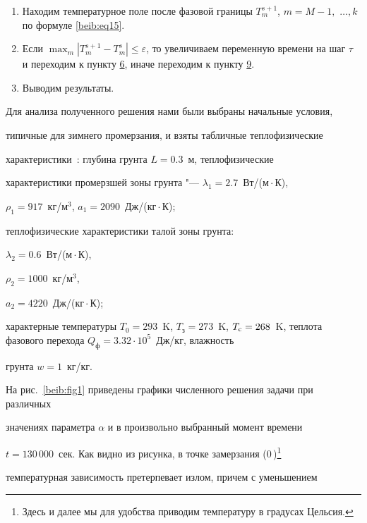\begin{enumerate}
\item Находим температурное поле после фазовой границы $T_m^{s+1}$, $m={M-1},$ $\ldots,k$ по формуле \eqref{beib:eq15}.

\item Если $\max _m | T_m^{s+1} -T_m^s |\le \varepsilon$, то увеличиваем переменную времени на шаг $\tau $ и переходим к пункту \hyperlink{p6}{6}, иначе переходим к пункту \hyperlink{p9}{9}.

\item \hypertarget{p17}{} Выводим результаты.

\end{enumerate}



\smallskip




Для анализа полученного решения нами были выбраны начальные условия, 

типичные для зимнего промерзания, и взяты табличные теплофизические 

характеристики~\cite[стр.~133]{beib:bib17}: глубина грунта $L=0.3$~м, теплофизические 

характеристики промерзшей зоны грунта "--- $\lambda _1 =2.7$~Вт/(м${}\cdot{}$К), 

$\rho _1  =917$~кг/м$^3$, $a_1 =2090$~Дж/(кг${}\cdot{}$К); 

теплофизические характеристики талой  зоны грунта: 

$\lambda _2 =0.6$~Вт/(м${}\cdot{}$К), 

$\rho _2 =1000$~кг/м$^3$, 

$a_2  =4220$~Дж/(кг${}\cdot{}$К); 

характерные температуры $T_0 =293$~K, $T_{\text{з}} =273$~K, $T_{\rm c} 

=268$~K, теплота фазового перехода $Q_{\text{ф}} =3.32 \cdot   10^5$~Дж/кг, влажность 

грунта $w=1$~кг/кг.



На рис.~\ref{beib:fig1} приведены графики численного решения задачи при различных 

значениях параметра $\alpha $ и в произвольно выбранный момент времени 

${t=130\,000}$~сек. Как видно из рисунка, в точке замерзания ($0$\,\textcelsius)\footnote{Здесь и далее мы для удобства приводим температуру в градусах Цельсия.} \!\!

температур\-ная зависимость претерпевает излом, причем с уменьшением 

